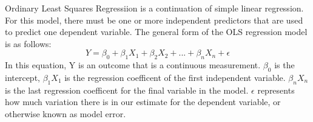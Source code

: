 \documentclass[12pt]{article}
\begin{document}
Ordinary Least Squares Regressiion is a continuation of simple linear regression. 
For this model, there must be one or more independent predictors that are used to predict one dependent variable. 
The general form of the OLS regression model is as follows: 
\begin{equation}
  Y = \beta_0 + \beta_1 X_1 + \beta_2 X_2 + ... + \beta_n X_n + \epsilon
\end{equation}
In this equation, Y is an outcome that is a continuous measurement. $\beta_0$ is the intercept, $\beta_1 X_1$ is the regression coefficent of the first independent variable. 
$\beta_n X_n$ is the last regression coefficent for the final variable in the model.
$\epsilon$ represents how much variation there is in our estimate for the dependent variable, or otherwise known as model error. 
\end{document}
